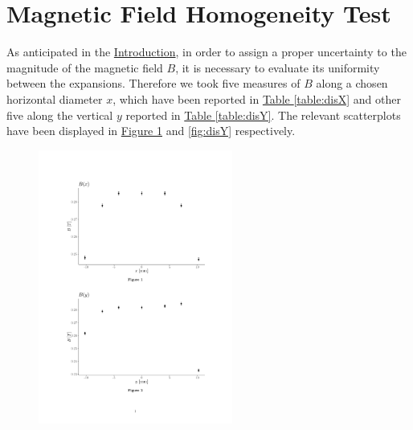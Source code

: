 \documentclass[a4paper,12pt,abstracton]{scrartcl}
\begin{document}
\section{Magnetic Field Homogeneity Test}
As anticipated in the \hyperref[sec:Intro]{Introduction}, in order to assign a proper uncertainty to the magnitude of the magnetic field $B$, it is necessary to evaluate its uniformity between the expansions. Therefore we took five measures of $B$ along a chosen horizontal diameter $x$, which have been reported in \hyperref[table:disX]{Table \ref*{table:disX}} and other five along the vertical $y$ reported in \hyperref[table:disY]{Table \ref*{table:disY}}. The relevant scatterplots have been displayed in \hyperref[fig:disX]{Figure \ref*{fig:disX}} and \hyperref[fig:disY]{ \ref*{fig:disY}} respectively.

\begin{table}[H]
\centering
\caption{}
\label{table:disX}
\end{table}

\begin{figure}[H]
\begin{center}
\includegraphics[trim=3cm 16.25cm 3cm 3cm, clip,height=9cm,keepaspectratio]{plots/MagneticDishomogeneity.pdf}
\end{center}
\caption{}
\label{fig:disX}
\end{figure}
\end{document}
